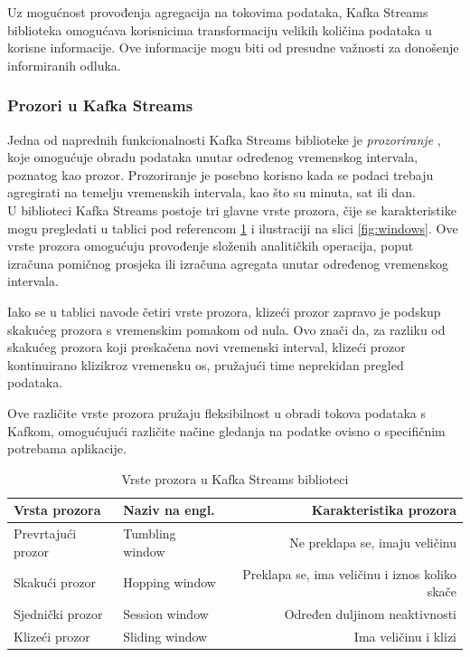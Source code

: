 \documentclass[times, utf8, diplomski]{fer}
\begin{document}
Uz mogućnost provođenja agregacija na tokovima podataka, Kafka Streams biblioteka omogućava korisnicima transformaciju velikih količina podataka u korisne informacije. Ove informacije mogu biti od presudne važnosti za donošenje informiranih odluka.

\subsubsection{Prozori u Kafka Streams}

Jedna od naprednih funkcionalnosti Kafka Streams biblioteke je \emph{prozoriranje} , koje omogućuje obradu podataka unutar određenog vremenskog intervala, poznatog kao prozor. Prozoriranje je posebno korisno kada se podaci trebaju agregirati na temelju vremenskih intervala, kao što su minuta, sat ili dan.\\

U biblioteci Kafka Streams postoje tri glavne vrste prozora, čije se karakteristike mogu pregledati u tablici pod referencom \ref{tbl:windows} i ilustraciji na slici \ref{fig:windows}. Ove vrste prozora omogućuju provođenje složenih analitičkih operacija, poput izračuna pomičnog prosjeka ili izračuna agregata unutar određenog vremenskog intervala.

Iako se u tablici navode četiri vrste prozora, klizeći prozor  zapravo je podskup skakućeg prozora  s vremenskim pomakom od nula. Ovo znači da, za razliku od skakućeg prozora koji \glqq preskače\grqq na novi vremenski interval, klizeći prozor kontinuirano \glqq klizi\grqq kroz vremensku os, pružajući time neprekidan pregled podataka.

Ove različite vrste prozora pružaju fleksibilnost u obradi tokova podataka s Kafkom, omogućujući različite načine gledanja na podatke ovisno o specifičnim potrebama aplikacije.

\begin{table}[htb]
\caption{Vrste prozora u Kafka Streams biblioteci}
\label{tbl:windows}
\centering
\begin{tabular}{l|l|r} \toprule
Vrsta prozora & Naziv na engl. & Karakteristika prozora \\ \midrule
Prevrtajući prozor & Tumbling window & Ne preklapa se, imaju veličinu\\
Skakući prozor & Hopping window & Preklapa se, ima veličinu i iznos koliko skače\\
Sjednički prozor & Session window & Određen duljinom neaktivnosti\\
Klizeći prozor & Sliding window & Ima veličinu i klizi \\ \bottomrule
\end{tabular}
\end{table} 
\end{document}
